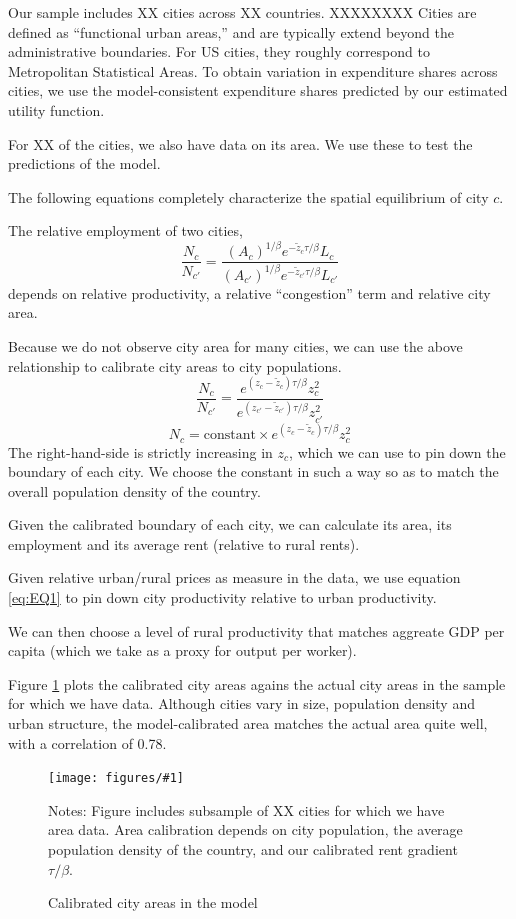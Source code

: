 \documentclass[12pt]{article}
\newcommand{\dofigure}[3]{\begin{figure}
\begin{centering}
\texttt{[image: figures/\#1]}
  \caption{#2\label{fig:#1}}
\end{centering}

\noindent \footnotesize{#3}
\end{figure}}
\begin{document}
Our sample includes XX cities across XX countries.
XXXXXXXX Cities are defined as ``functional urban areas,'' and are typically extend beyond the administrative boundaries. For US cities, they roughly correspond to Metropolitan Statistical Areas. To obtain variation in expenditure shares across cities, we use the model-consistent expenditure shares predicted by our estimated utility function.

For XX of the cities, we also have data on its area. We use these to test the predictions of the model.

The following equations completely characterize the spatial equilibrium of city $c$.

The relative employment of two cities,
\[
\frac{N_c}{N_{c'}}
= \frac
	 {\left(A_c\right)^{1/\beta} e^{-\tilde z_c{\tau/\beta}} L_{c}}
	 {\left(A_{c'}\right)^{1/\beta} e^{-\tilde z_{c'}{\tau/\beta}} L_{c'}}
\]
depends on relative productivity, a relative ``congestion'' term and relative city area.

Because we do not observe city area for many cities, we can use the above relationship to calibrate city areas to city populations.
\[
\frac{N_c}{N_{c'}}
= \frac
	 {e^{(z_c-\tilde z_c){\tau/\beta}} z_{c}^2}
	 {e^{(z_{c'}-\tilde z_{c'}){\tau/\beta}} z_{c'}^2}
\]
\[
{N_c}
= \text{constant} \times {e^{(z_c-\tilde z_c){\tau/\beta}} z_{c}^2}
\]
The right-hand-side is strictly increasing in $z_c$, which we can use to pin down the boundary of each city. We choose the constant in such a way so as to match the overall population density of the country.

Given the calibrated boundary of each city, we can calculate its area, its employment and its average rent (relative to rural rents). 

Given relative urban/rural prices as measure in the data, we use equation \eqref{eq:EQ1} to pin down city productivity relative to urban productivity.

We can then choose a level of rural productivity that matches aggreate GDP per capita (which we take as a proxy for output per worker).

Figure \ref{fig:../../research_designs/city_level_inputs/output/area_model_data} plots the calibrated city areas agains the actual city areas in the sample for which we have data. Although cities vary in size, population density and urban structure, the model-calibrated area matches the actual area quite well, with a correlation of 0.78. 

\dofigure{../../research_designs/city_level_inputs/output/area_model_data}{Calibrated city areas in the model}{Notes: Figure includes subsample of XX cities for which we have area data. Area calibration depends on city population, the average population density of the country, and our calibrated rent gradient $\tau/\beta$.}
\end{document}
